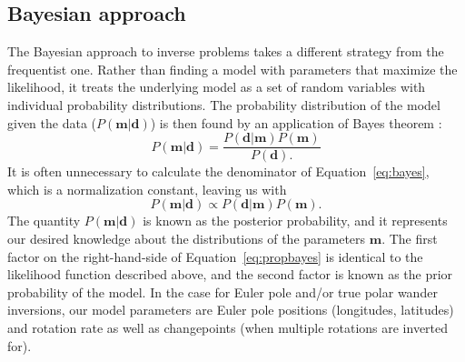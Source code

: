 \documentclass[11pt,letterpaper]{article}
\begin{document}
\subsection*{Bayesian approach}

The Bayesian approach to inverse problems takes a different strategy from the frequentist one. Rather than finding a model with parameters that maximize the likelihood, it treats the underlying model as a set of random variables with individual probability distributions. The probability distribution of the model given the data ($P(\mathbf{m} \vert \mathbf{d})$) is then found by an application of Bayes theorem \citep[cf.][]{Sivia2006a}:
\begin{equation}
P\left(\mathbf{m} \vert \mathbf{d} \right) = \frac{ P \left(\mathbf{d}\vert \mathbf{m} \right) P \left( \mathbf{m} \right) }{P \left( \mathbf{d}\right).}
\label{eq:bayes}
\end{equation}
It is often unnecessary to calculate the denominator of Equation~\eqref{eq:bayes}, which is a normalization constant, leaving us with
\begin{equation}
P\left(\mathbf{m} \vert \mathbf{d} \right) \propto P \left( \mathbf{d} \vert \mathbf{m} \right) P \left( \mathbf{m} \right).
\label{eq:propbayes}
\end{equation}
The quantity $P(\mathbf{m} \vert \mathbf{d})$ is known as the posterior probability, and it represents our desired knowledge about the distributions of the parameters $\mathbf{m}$. The first factor on the right-hand-side of Equation~\eqref{eq:propbayes} is identical to the likelihood function described above, and the second factor
is known as the prior probability of the model. In the case for Euler pole and/or true polar wander inversions, our model parameters are Euler pole positions (longitudes, latitudes) and rotation rate as well as changepoints (when multiple rotations are inverted for). 

\end{document}
